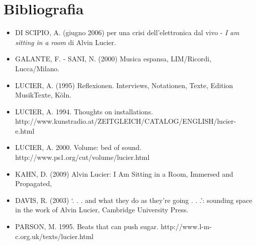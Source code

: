 
\section{Bibliografia}
\begin{itemize}
    \item DI SCIPIO, A. (giugno 2006) per una crisi dell'elettronica dal vivo - \textit{I am sitting in a room} di Alvin Lucier.
    \item GALANTE, F. - SANI, N. (2000) Musica espansa, LIM/Ricordi, Lucca/Milano.
    \item LUCIER, A. (1995) Reflexionen. Interviews, Notationen, Texte, Edition MusikTexte, Köln.
    \item LUCIER, A. 1994. Thoughts on installations. http://www.kunstradio.at/ZEITGLEICH/CATALOG/ENGLISH/lucier-e.html
    \item LUCIER, A. 2000. Volume: bed of sound. http://www.ps1.org/cut/volume/lucier.html
    \item KAHN, D. (2009) Alvin Lucier: I Am Sitting in a Room, Immersed and Propagated,
    \item DAVIS, R. (2003) ‘. . . and what they do as they’re going . . .’: sounding space in the work of Alvin Lucier, Cambridge University Press.
    \item PARSON, M. 1995. Beats that can push sugar. http://www.l-m-c.org.uk/texts/lucier.html
\end{itemize}